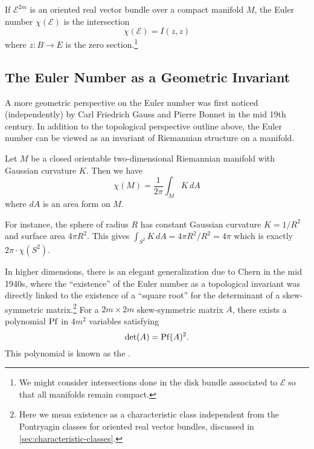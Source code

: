 \begin{definition}\label{def:euler-number-self-intersection}
  If $\mathcal{E}^{2m}$ is an oriented real vector bundle over a compact manifold $M$, 
	the Euler number $\chi(\mathcal{E})$ is the intersection
	\[
		\chi(\mathcal{E}) = I(z,z)
	\]
	where $z : B \to E$ is the zero section.\footnote{We might consider intersections done in the disk bundle associated to $\mathcal{E}$ so that all manifolds remain compact.}
\end{definition}

\subsection{The Euler Number as a Geometric Invariant}\label{sec:euler-number-geometric}

A more geometric perspective on the Euler number was first noticed (independently) by Carl Friedrich Gauss and Pierre Bonnet in the mid 19th century. In addition to the topological perspective outline above, the Euler number can be viewed as an invariant of Riemannian structure on a manifold.

\begin{theorem}
  Let $M$ be a closed orientable two-dimensional Riemannian manifold with Gaussian curvature $K$. Then we have
  \[
    \chi(M) = \frac{1}{2\pi}\int_M K\,dA
  \]
  where $dA$ is an area form on $M$.
\end{theorem}
For instance, the sphere of radius $R$ has constant Gaussian curvature $K=1/R^2$ and surface area $4\pi R^2$. This gives $\int_{S^2}K\,dA =4\pi R^2/R^2=4\pi$ which is exactly $2\pi\cdot \chi(S^2)$.

In higher dimensions, there is an elegant generalization due to Chern in the mid 1940s, where the ``existence'' of the Euler number as a topological invariant was directly linked to the existence of a ``square root'' for the determinant of a skew-symmetric matrix.\footnote{Here we mean existence as a characteristic class independent from the Pontryagin classes for oriented real vector bundles, discussed in \cref{sec:characteristic-classes}.} For a $2m\times 2m$ skew-symmetric matrix $A$, there exists a polynomial $\operatorname{Pf}$ in $4m^2$ variables satisfying \[\det(A) = \operatorname{Pf}(A)^2.\] This polynomial is known as the .

